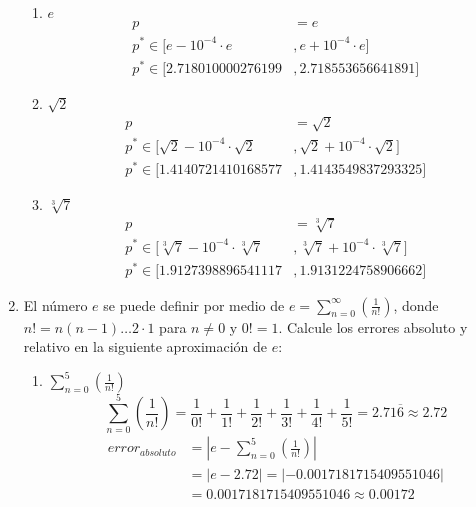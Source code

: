 \documentclass[12pt]{article}
\begin{document}
\begin{enumerate}
\begin{enumerate}[label=\alph*.]
        \item \(e\)
        \[
            \begin{aligned}
                p &= e \\   
                p^{*} \in [e-10^{-4}\cdot e& ,  e+10^{-4}\cdot e] \\
                p^{*} \in [2.718010000276199& ,  2.718553656641891]
            \end{aligned}
        \]
        \item \(\sqrt{2}\)
        \[
            \begin{aligned}
                p &= \sqrt{2} \\   
                p^{*} \in [\sqrt{2}-10^{-4}\cdot \sqrt{2}& ,  \sqrt{2}+10^{-4}\cdot \sqrt{2}] \\
                p^{*} \in [1.4140721410168577& ,  1.4143549837293325]
            \end{aligned}
        \]
        \item \(\sqrt[3]{7}\)
        \[
            \begin{aligned}
                p &= \sqrt[3]{7} \\   
                p^{*} \in [\sqrt[3]{7}-10^{-4}\cdot \sqrt[3]{7}& ,  \sqrt[3]{7}+10^{-4}\cdot \sqrt[3]{7}] \\
                p^{*} \in [1.9127398896541117& ,  1.9131224758906662]
            \end{aligned}
        \]
    \end{enumerate}
    \item El número \(e\) se puede definir por medio de \(e = \sum_{n = 0}^{\infty} \left( \frac{1}{n!} \right)\), donde \(n! = n(n-1) \dots 2 \cdot 1\) para \(n \neq 0\) y \(0! = 1\). Calcule los errores absoluto y relativo en la siguiente aproximación de \(e\): 
    \begin{enumerate}[label=\alph*.]
        \item \(\sum_{n=0}^{5} \left( \frac{1}{n!}\right)\)
        \[
        \sum_{n = 0}^{5} \left( \frac{1}{n!}\right) = \frac{1}{0!} + \frac{1}{1!} + \frac{1}{2!} + \frac{1}{3!} + \frac{1}{4!} + \frac{1}{5!} = 2.71\overline{6} \approx 2.72
        \]
        \[
            \begin{aligned}
                error_{absoluto} &= \left| e - \sum_{n = 0}^{5} \left( \frac{1}{n!}\right)\right| \\
                                 &= \left| e - 2.72 \right| = |-0.0017181715409551046| \\
                                 &= 0.0017181715409551046 \approx 0.00172        

\end{aligned}\]
\end{enumerate}
\end{enumerate}
\end{document}
